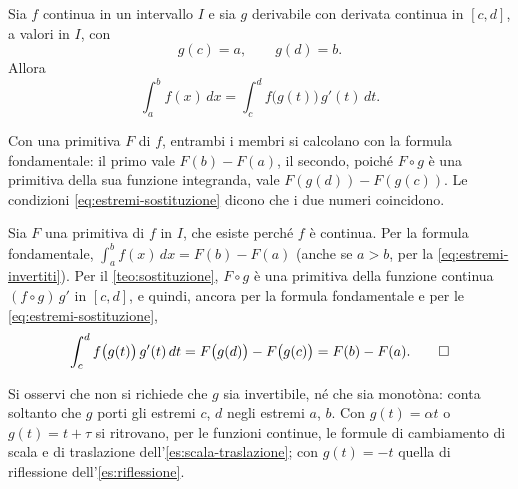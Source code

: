 \begin{teorema}\label{teo:sostituzione-definita}
Sia $f$ continua in un intervallo $I$ e sia $g$ derivabile con derivata continua in
$[c,d]$, a valori in $I$, con
\begin{equation}\label{eq:estremi-sostituzione}
  g(c)=a, \qquad g(d)=b .
\end{equation}
Allora
\begin{equation}\label{eq:sostituzione-definita}
  \int_{a}^{b}f(x)\,dx=\int_{c}^{d}f\bigl(g(t)\bigr)\,g'(t)\,dt .
\end{equation}
\end{teorema}

\begin{schema}
\end{schema}

\begin{strategia}
Con una primitiva $F$ di $f$, entrambi i membri si calcolano con la formula fondamentale:
il primo vale $F(b)-F(a)$, il secondo, poiché $F\circ g$ è una primitiva della sua funzione
integranda, vale $F(g(d))-F(g(c))$. Le condizioni \eqref{eq:estremi-sostituzione} dicono che
i due numeri coincidono.
\end{strategia}

\begin{dimostrazione}
Sia $F$ una primitiva di $f$ in $I$, che esiste perché $f$ è continua. Per la formula
fondamentale, $\int_{a}^{b}f(x)\,dx=F(b)-F(a)$ (anche se $a>b$, per la
\eqref{eq:estremi-invertiti}). Per il \cref{teo:sostituzione}, $F\circ g$ è una primitiva
della funzione continua $(f\circ g)\,g'$ in $[c,d]$, e quindi, ancora per la formula
fondamentale e per le \eqref{eq:estremi-sostituzione},
\[
  \int_{c}^{d}f\bigl(g(t)\bigr)\,g'(t)\,dt=F\bigl(g(d)\bigr)-F\bigl(g(c)\bigr)=F(b)-F(a) . \qedhere
\]
\end{dimostrazione}

Si osservi che non si richiede che $g$ sia invertibile, né che sia monotòna: conta
soltanto che $g$ porti gli estremi $c$, $d$ negli estremi $a$, $b$. Con $g(t)=\alpha t$ o
$g(t)=t+\tau$ si ritrovano, per le funzioni continue, le formule di cambiamento di scala e
di traslazione dell'\cref{es:scala-traslazione}; con $g(t)=-t$ quella di riflessione
dell'\cref{es:riflessione}.

